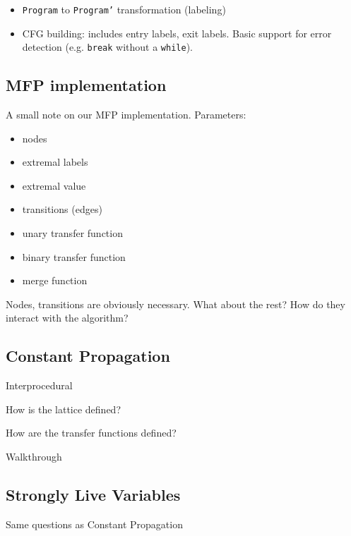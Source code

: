 \documentclass{article}
\begin{document}
\begin{itemize}
	\item \texttt{Program} to \texttt{Program'} transformation (labeling)
	\item CFG building: includes entry labels, exit labels. Basic support for error detection (e.g. \texttt{break} without a \texttt{while}).
\end{itemize}

\subsection*{MFP implementation}

A small note on our MFP implementation. Parameters:

\begin{itemize}
	\item nodes
	\item extremal labels
	\item extremal value
	\item transitions (edges)
	\item unary transfer function
	\item binary transfer function
	\item merge function
\end{itemize}

Nodes, transitions are obviously necessary. What about the rest? How do they interact with the algorithm?

\subsection*{Constant Propagation}

Interprocedural

How is the lattice defined?

How are the transfer functions defined?

Walkthrough

\subsection*{Strongly Live Variables}

Same questions as Constant Propagation
\end{document}
